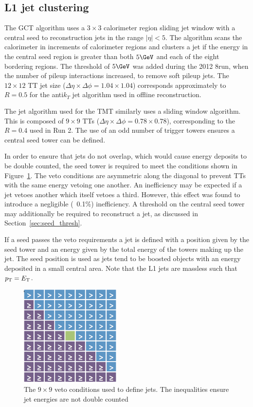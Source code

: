 \subsection{L1 jet clustering}
\label{sec:jet_algo}
The GCT algorithm uses a $3\times3$ calorimeter region sliding jet window with a central seed 
to reconstruction jets in the range $|\eta| < 5$. The algorithm scans the calorimeter in increments
of calorimeter regions and clusters a jet if the energy in the central seed region is greater than 
both $5\GeV$ and each of the eight bordering regions. The threshold of $5\GeV$ was added during 
the 2012 8\TeV run, when the number of pileup interactions increased, to remove soft pileup jets.
The $12\times12$ TT jet size ($\Delta\eta\times\Delta\phi = 1.04\times1.04$) corresponds 
approximately to $R=0.5$ for the anti$k_T$ jet algorithm used in offline reconstruction.

The jet algorithm used for the TMT similarly uses a sliding window algorithm. This
is composed of $9\times9$ TTs ($\Delta\eta\times\Delta\phi = 0.78\times0.78$), corresponding 
to the $R=0.4$ used in Run 2. The use of an odd number of trigger towers ensures a central 
seed tower can be defined. 

In order to ensure that jets do not overlap, which would cause energy deposits 
to be double counted, the seed tower is required to meet the conditions
shown in Figure~\ref{mask}. The veto conditions are asymmetric along the diagonal to prevent  
TTs with the same energy vetoing one another. An inefficiency may be expected 
if a jet vetoes another which itself vetoes a third. However, this effect was found to 
introduce a negligible (~0.1\%) inefficiency. A threshold on the central seed tower may 
additionally be required to reconstruct a jet, as discussed in Section~\ref{sec:seed_thresh}. 

If a seed passes the veto requirements a jet is defined with a position 
given by the seed tower and an energy given by the total energy of the towers
making up the jet. The seed position is used as jets tend to be boosted
 objects with an energy deposited in a small central area. 
Note that the L1 jets are massless such that ${p_{\text T}} = {E_{\text T}}$.

\begin{figure}
\centering
    \includegraphics[width=0.45\textwidth]{./Figures/triggerUpgrade/mask.png}
  \caption{The $9\times9$ veto conditions used to define jets. The inequalities ensure
  jet energies are not double counted}
  \label{mask}
\end{figure}

